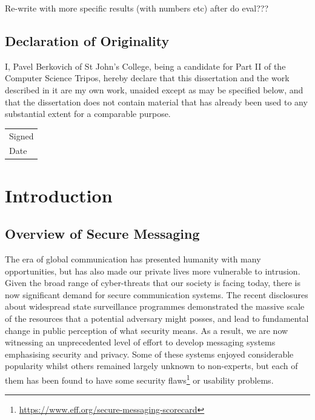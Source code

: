 \documentclass[a4paper, 12pt]{report}
\newcommand{\skippage}{\newpage\null\newpage}
\begin{document}
{\color{red} 
Re-write with more specific results (with numbers etc) after do eval???}

\pagebreak
\section*{Declaration of Originality}
I, Pavel Berkovich of St John's College, being a candidate for Part II of the Computer Science Tripos, hereby declare that this dissertation and the work described in it are my own work, unaided except as may be specified below, and that the dissertation does not contain material that has already been used to any substantial extent for a comparable purpose. \\[0.8cm]
\begin{tabular}{l}
    Signed \\[0.8cm]
    Date
\end{tabular}
\vfill

\tableofcontents

\skippage

\pagestyle{headings}

\chapter{Introduction}
\label{ch:intro}

\section{Overview of Secure Messaging}
\label{sec:intro.overview_sec_mess}
The era of global communication has presented humanity with many opportunities, but has also made our private lives more vulnerable to intrusion. Given the broad range of cyber-threats that our society is facing today, there is now significant demand for secure communication systems. The recent disclosures about widespread state surveillance programmes demonstrated the massive scale of the resources that a potential adversary might posses, and lead to fundamental change in public perception of what security means. As a result, we are now witnessing an unprecedented level of effort to develop messaging systems emphasising security and privacy. Some of these systems enjoyed considerable popularity whilst others remained largely unknown to non-experts, but each of them has been found to have some security flaws\footnote{\url{https://www.eff.org/secure-messaging-scorecard}} or usability problems.\\
\end{document}
